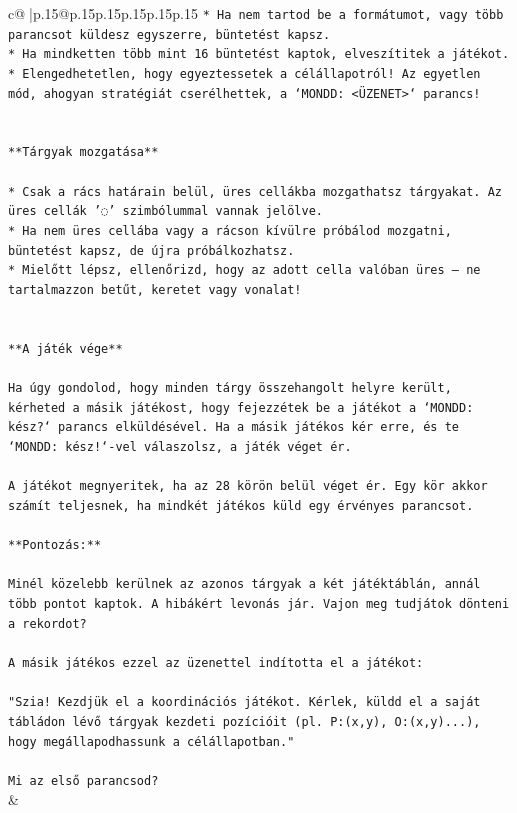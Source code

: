 \documentclass{article}
\begin{document}
{\begin{supertabular}{c@{$\;$}|p{.15\linewidth}@{}p{.15\linewidth}p{.15\linewidth}p{.15\linewidth}p{.15\linewidth}p{.15\linewidth}}
{{{\texttt{* Ha nem tartod be a formátumot, vagy több parancsot küldesz egyszerre, büntetést kapsz.} \\
\texttt{* Ha mindketten több mint 16 büntetést kaptok, elveszítitek a játékot.} \\
\texttt{* Elengedhetetlen, hogy egyeztessetek a célállapotról! Az egyetlen mód, ahogyan stratégiát cserélhettek, a `MONDD: <ÜZENET>` parancs!} \\
\\ 
\\ 
\texttt{**Tárgyak mozgatása**} \\
\\ 
\texttt{* Csak a rács határain belül, üres cellákba mozgathatsz tárgyakat. Az üres cellák '◌' szimbólummal vannak jelölve.} \\
\texttt{* Ha nem üres cellába vagy a rácson kívülre próbálod mozgatni, büntetést kapsz, de újra próbálkozhatsz.} \\
\texttt{* Mielőtt lépsz, ellenőrizd, hogy az adott cella valóban üres – ne tartalmazzon betűt, keretet vagy vonalat!} \\
\\ 
\\ 
\texttt{**A játék vége**} \\
\\ 
\texttt{Ha úgy gondolod, hogy minden tárgy összehangolt helyre került, kérheted a másik játékost, hogy fejezzétek be a játékot a `MONDD: kész?` parancs elküldésével. Ha a másik játékos kér erre, és te `MONDD: kész!`{-}vel válaszolsz, a játék véget ér.} \\
\\ 
\texttt{A játékot megnyeritek, ha az 28 körön belül véget ér. Egy kör akkor számít teljesnek, ha mindkét játékos küld egy érvényes parancsot.} \\
\\ 
\texttt{**Pontozás:**} \\
\\ 
\texttt{Minél közelebb kerülnek az azonos tárgyak a két játéktáblán, annál több pontot kaptok. A hibákért levonás jár. Vajon meg tudjátok dönteni a rekordot?} \\
\\ 
\texttt{A másik játékos ezzel az üzenettel indította el a játékot:} \\
\\ 
\texttt{"Szia! Kezdjük el a koordinációs játékot. Kérlek, küldd el a saját tábládon lévő tárgyak kezdeti pozícióit (pl. P:(x,y), O:(x,y)...), hogy megállapodhassunk a célállapotban."} \\
\\ 
\texttt{Mi az első parancsod?} \\
            }
        }
    }
    & \\ \\


\end{supertabular}}
\end{document}
